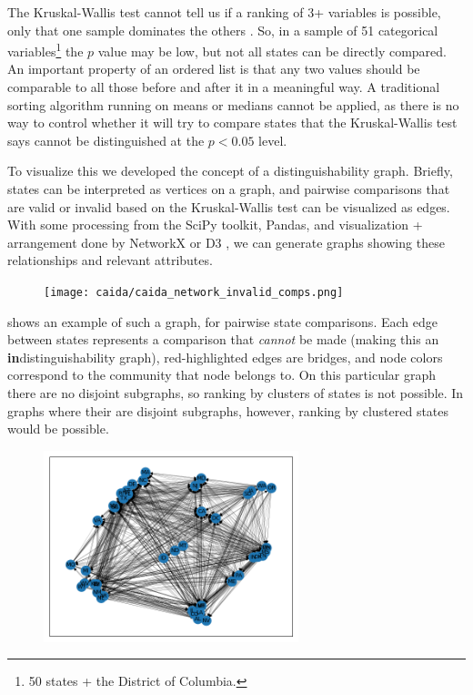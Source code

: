 The Kruskal-Wallis test cannot tell us if a ranking of 3+ variables is possible, only that one sample dominates the others \cite{kruskal-wallis}. So, in a sample of 51 categorical variables\footnote{50 states + the District of Columbia.} the $p$ value may be low, but not all states can be directly compared. An important property of an ordered list is that any two values should be comparable to all those before and after it in a meaningful way. A traditional sorting algorithm running on means or medians cannot be applied, as there is no way to control whether it will try to compare states that the Kruskal-Wallis test says cannot be distinguished at the $p<0.05$ level.

To visualize this we developed the concept of a distinguishability graph. Briefly, states can be interpreted as vertices on a graph, and pairwise comparisons that are valid or invalid based on the Kruskal-Wallis test can be visualized as edges. With some processing from the SciPy toolkit, Pandas, and visualization + arrangement done by NetworkX or D3 \cite{scipy, pandas, networkx, Bostock2011a}, we can generate graphs showing these relationships and relevant attributes.

\begin{figure}[h]
    \centering
    \texttt{[image: caida/caida\_network\_invalid\_comps.png]}
\end{figure}

 shows an example of such a graph, for pairwise state comparisons. Each edge between states represents a comparison that \textit{cannot} be made (making this an \textbf{in}distinguish\-ability graph), red-highlighted edges are bridges, and node colors correspond to the community that node belongs to. On this particular graph there are no disjoint subgraphs, so ranking by clusters of states is not possible. In graphs where their are disjoint subgraphs, however, ranking by clustered states would be possible.

\begin{figure}[h]
    \centering
    \includegraphics[width=0.66\textwidth]{images/caida/caida_network_valid_comps.png}
\end{figure}

